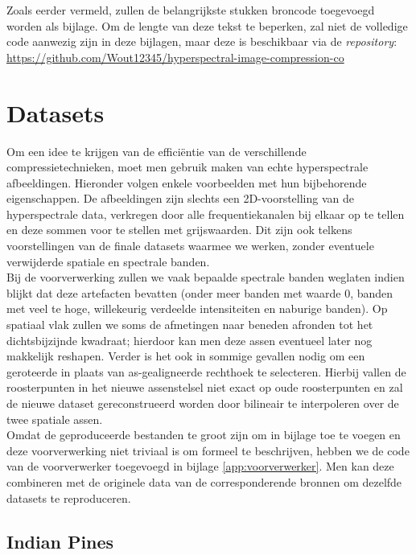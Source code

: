 Zoals eerder vermeld, zullen de belangrijkste stukken broncode toegevoegd worden als bijlage. Om de lengte van deze tekst te beperken, zal niet de volledige code aanwezig zijn in deze bijlagen, maar deze is beschikbaar via de \textit{repository}: \url{https://github.com/Wout12345/hyperspectral-image-compression-co}

\section{Datasets}

Om een idee te krijgen van de effici\"entie van de verschillende compressietechnieken, moet men gebruik maken van echte hyperspectrale afbeeldingen. Hieronder volgen enkele voorbeelden met hun bijbehorende eigenschappen. De afbeeldingen zijn slechts een 2D-voorstelling van de hyperspectrale data, verkregen door alle frequentiekanalen bij elkaar op te tellen en deze sommen voor te stellen met grijswaarden. Dit zijn ook telkens voorstellingen van de finale datasets waarmee we werken, zonder eventuele verwijderde spatiale en spectrale banden.\\

Bij de voorverwerking zullen we vaak bepaalde spectrale banden weglaten indien blijkt dat deze artefacten bevatten (onder meer banden met waarde 0, banden met veel te hoge, willekeurig verdeelde intensiteiten en naburige banden). Op spatiaal vlak zullen we soms de afmetingen naar beneden afronden tot het dichtsbijzijnde kwadraat; hierdoor kan men deze assen eventueel later nog makkelijk reshapen. Verder is het ook in sommige gevallen nodig om een geroteerde in plaats van as-gealigneerde rechthoek te selecteren. Hierbij vallen de roosterpunten in het nieuwe assenstelsel niet exact op oude roosterpunten en zal de nieuwe dataset gereconstrueerd worden door bilineair te interpoleren \cite{ref:bilinear_interpolation} over de twee spatiale assen.\\

Omdat de geproduceerde bestanden te groot zijn om in bijlage toe te voegen en deze voorverwerking niet triviaal is om formeel te beschrijven, hebben we de code van de voorverwerker toegevoegd in bijlage \ref{app:voorverwerker}. Men kan deze combineren met de originele data van de corresponderende bronnen om dezelfde datasets te reproduceren.

\subsection{Indian Pines}

